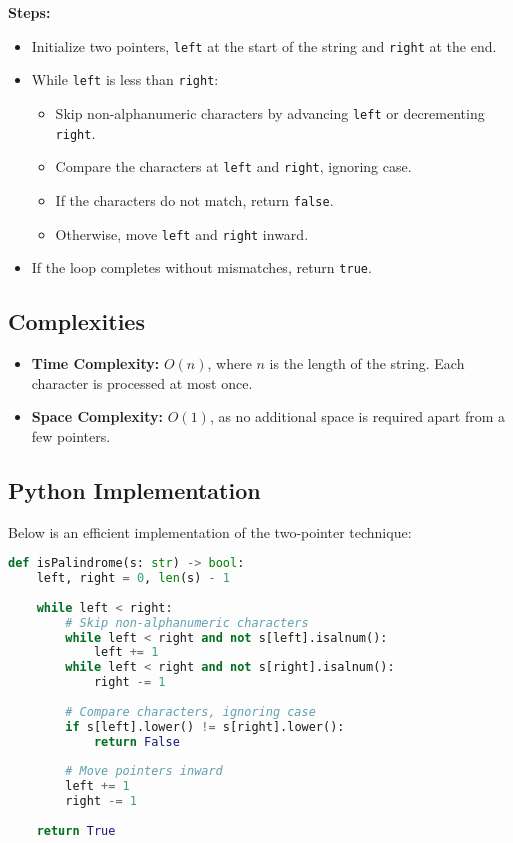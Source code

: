 \textbf{Steps:}
\begin{itemize}
    \item Initialize two pointers, \texttt{left} at the start of the string and \texttt{right} at the end.
    \item While \texttt{left} is less than \texttt{right}:
    \begin{itemize}
        \item Skip non-alphanumeric characters by advancing \texttt{left} or decrementing \texttt{right}.
        \item Compare the characters at \texttt{left} and \texttt{right}, ignoring case.
        \item If the characters do not match, return \texttt{false}.
        \item Otherwise, move \texttt{left} and \texttt{right} inward.
    \end{itemize}
    \item If the loop completes without mismatches, return \texttt{true}.
\end{itemize}

\subsection*{Complexities}
\begin{itemize}
    \item \textbf{Time Complexity:} \(O(n)\), where \(n\) is the length of the string. Each character is processed at most once.
    \item \textbf{Space Complexity:} \(O(1)\), as no additional space is required apart from a few pointers.
\end{itemize}

\subsection*{Python Implementation}
Below is an efficient implementation of the two-pointer technique:

\begin{fullwidth}
\begin{lstlisting}[language=Python]
def isPalindrome(s: str) -> bool:
    left, right = 0, len(s) - 1
    
    while left < right:
        # Skip non-alphanumeric characters
        while left < right and not s[left].isalnum():
            left += 1
        while left < right and not s[right].isalnum():
            right -= 1
        
        # Compare characters, ignoring case
        if s[left].lower() != s[right].lower():
            return False
        
        # Move pointers inward
        left += 1
        right -= 1
    
    return True
\end{lstlisting}
\end{fullwidth}

